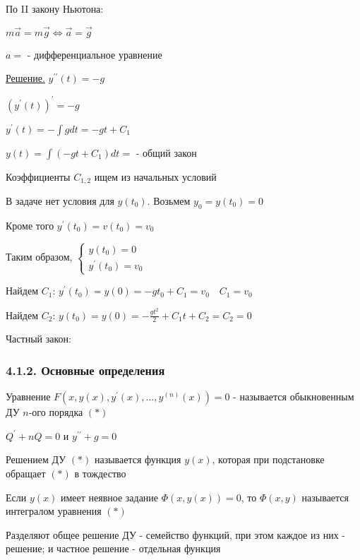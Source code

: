 \documentclass[12pt]{article}
\begin{document}
    По II закону Ньютона:

    $m\vec{a} = m\vec{g} \Longleftrightarrow \vec{a} = \vec{g}$

    $a = $ - дифференциальное уравнение

    \underline{Решение.} \quad $y^{\prime\prime}(t) = -g$

    $(y^{\prime}(t))^\prime = -g$

    $y^{\prime}(t) = -\int g dt = -gt + C_1$

    $y(t) = \int (-gt + C_1) dt = $ - общий закон

    Коэффициенты $C_{1,2}$ ищем из начальных условий

    В задаче нет условия для $y(t_0)$. Возьмем $y_0 = y(t_0) = 0$

    Кроме того $y^\prime(t_0) = v(t_0) = v_0$

    Таким образом, $\begin{cases}y(t_0) = 0 \\ y^\prime(t_0) = v_0\end{cases}$

    Найдем $C_1$: $y^\prime(t_0) = y(0) = -gt_0 + C_1 = v_0 \quad C_1 = v_0$

    Найдем $C_2$: $y(t_0) = y(0) = -\frac{gt^2}{2} + C_1 t + C_2 = C_2 = 0$

    Частный закон: 

    \subsubsection{4.1.2. Основные определения}

    \hypertarget{differentialequationdefinition}{}

     Уравнение $F(x, y(x), y^\prime(x), \dots, y^{(n)}(x)) = 0$ - называется обыкновенным ДУ $n$-ого порядка $(*)$

    \Exs $Q^\prime + nQ = 0$ и $y^{\prime\prime} + g = 0$

     Решением ДУ $(*)$ называется функция $y(x)$, которая при подстановке обращает $(*)$ в тождество

     Если $y(x)$ имеет неявное задание $\Phi(x, y(x)) = 0$, то $\Phi(x, y)$ называется интегралом уравнения $(*)$

    \Notas Разделяют общее решение ДУ - семейство функций, при этом каждое из них - решение; и
    частное решение - отдельная функция
\end{document}
